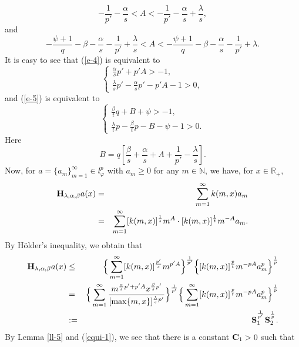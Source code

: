 \documentclass[10pt]{amsart}
\theoremstyle{definition}    %
\numberwithin{equation}{section}
\begin{document}
\begin{equation}\label{e-4} 
-\frac{1}{p'}-\frac{\alpha}{s}<A<-\frac{1}{p'}-\frac{\alpha}{s}+\frac{\lambda}{s},\end{equation}
and 
\begin{equation}\label{e-5}-\frac{\psi+1}{q}-\beta-\frac{\alpha}{s}-\frac{1}{p'}+\frac{\lambda}{s}<A<-\frac{\psi+1}{q}-\beta-\frac{\alpha}{s}-\frac{1}{p'}+\lambda.\end{equation}
It is easy to see that (\ref{e-4}) is equivalent to
\begin{equation}\label{equi-1}
\begin{cases}
\frac{\alpha}{s}p'+p'A>-1, \\
\frac{\lambda}{s}p'-\frac{\alpha}{s}p'-p'A-1>0,
\end{cases}
\end{equation}
and (\ref{e-5}) is equivalent to
\begin{equation}\label{equi-2}
\begin{cases}
\frac{\beta}{t}q+B+\psi>-1, \\
\frac{\lambda}{t}p-\frac{\beta}{t}p-B-\psi-1>0.
\end{cases}
\end{equation}
Here 
$$B=q[\frac{\beta}{s}+\frac{\alpha}{s}+A+\frac{1}{p'}-\frac{\lambda}{s}].$$
Now, for $a=\{a_m\}_{m=1}^{\infty}\in l_{\varphi}^{p}$ with $a_m\geq 0$ for any $m\in \mathbb{N}$, we have, for $x\in \mathbb{R}_{+}$, 
\begin{eqnarray}
{\bf H}_{\lambda, \alpha, \beta}a(x)&=&\sum_{m=1}^{\infty}k(m,x)a_m\nonumber \\
&=& \sum_{m=1}^{\infty}[k(m,x)]^{\frac{1}{s}}m^{A}\cdot[k(m,x)]^{\frac{1}{t}}m^{-A}a_m. \nonumber
\end{eqnarray}
By H\"{o}lder's inequality, we obtain that
\begin{eqnarray}
{\bf H}_{\lambda, \alpha, \beta}a(x)&\leq & \Big\{\sum_{m=1}^{\infty}[k(m,x)]^{\frac{p'}{s}}m^{p'A}\Big\}^{\frac{1}{p'}}\Big\{[k(m,x)]^{\frac{p}{t}}m^{-pA}a_m^p\Big\}^{\frac{1}{p}} \nonumber \\
&=& \Big\{\sum_{m=1}^{\infty}\frac{m^{\frac{\alpha}{s}p'+p'A}x^{\frac{\beta}{s}p'}}{[\max\{m,x\}]^{\frac{\lambda}{s}p'}}\Big\}^{\frac{1}{p'}}\Big\{\sum_{m=1}^{\infty}[k(m,x)]^{\frac{p}{t}}m^{-pA}a_m^p\Big\}^{\frac{1}{p}}
\nonumber \\
&:=& {\bf S}_1^{^{\frac{1}{p'}}}{\bf S}_2^{^{\frac{1}{p}}}.\nonumber
\end{eqnarray}
By Lemma \ref{ll-5} and (\ref{equi-1}), we see that there is a constant ${\bf C}_1>0$ such that
\end{document}

